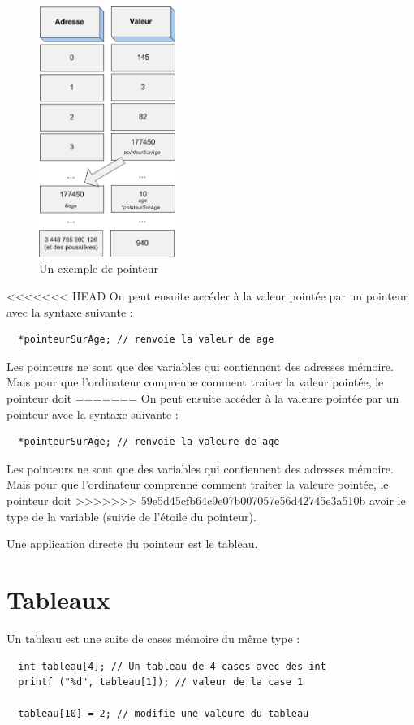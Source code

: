 \begin{figure}[H]
	\begin{center}
	  \includegraphics[width=12em]{Annexes/Images/pointeurs.png}
	\end{center}
	\caption{Un exemple de pointeur}
\end{figure}

<<<<<<< HEAD
On peut ensuite accéder à la valeur pointée par un pointeur avec la syntaxe suivante : 
\begin{lstlisting}
  *pointeurSurAge; // renvoie la valeur de age
\end{lstlisting}

Les pointeurs ne sont que des variables qui contiennent des adresses mémoire. Mais pour que l'ordinateur comprenne comment traiter la valeur pointée, le pointeur doit 
=======
On peut ensuite accéder à la valeure pointée par un pointeur avec la syntaxe suivante : 
\begin{lstlisting}
  *pointeurSurAge; // renvoie la valeure de age
\end{lstlisting}

Les pointeurs ne sont que des variables qui contiennent des adresses mémoire. Mais pour que l'ordinateur comprenne comment traiter la valeure pointée, le pointeur doit 
>>>>>>> 59e5d45cfb64c9e07b007057e56d42745e3a510b
avoir le type de la variable (suivie de l'étoile du pointeur).

Une application directe du pointeur est le tableau.

\section{Tableaux}
\label{DefTableaux}
Un tableau est une suite de cases mémoire du même type : 
\begin{lstlisting}
  int tableau[4]; // Un tableau de 4 cases avec des int
  printf ("%d", tableau[1]); // valeur de la case 1

  tableau[10] = 2; // modifie une valeure du tableau
\end{lstlisting}


